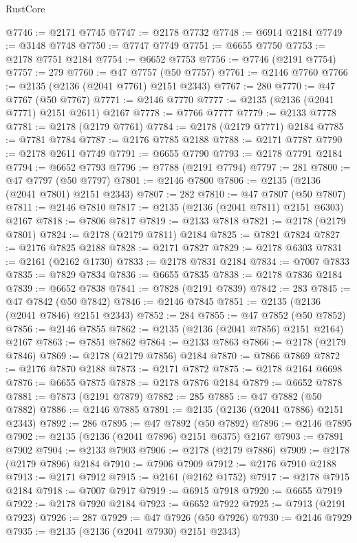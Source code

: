 \begin{lexlean}{RustCore}
\begin{coremodule}
@7746 := @2171 @7745
@7747 := @2178 @7732
@7748 := @6914 @2184
@7749 := @3148 @7748
@7750 := @7747 @7749
@7751 := @6655 @7750
@7753 := @2178 @7751 @2184
@7754 := @6652 @7753
@7756 := @7746 (@2191 @7754)
@7757 := 279
@7760 := @47 @7757 (@50 @7757)
@7761 := @2146 @7760
@7766 := @2135 (@2136 (@2041 @7761) @2151 @2343)
@7767 := 280
@7770 := @47 @7767 (@50 @7767)
@7771 := @2146 @7770
@7777 := @2135 (@2136 (@2041 @7771) @2151 @2611) @2167
@7778 := @7766 @7777
@7779 := @2133 @7778
@7781 := @2178 (@2179 @7761)
@7784 := @2178 (@2179 @7771) @2184
@7785 := @7781 @7784
@7787 := @2176 @7785 @2188
@7788 := @2171 @7787
@7790 := @2178 @2611 @7749
@7791 := @6655 @7790
@7793 := @2178 @7791 @2184
@7794 := @6652 @7793
@7796 := @7788 (@2191 @7794)
@7797 := 281
@7800 := @47 @7797 (@50 @7797)
@7801 := @2146 @7800
@7806 := @2135 (@2136 (@2041 @7801) @2151 @2343)
@7807 := 282
@7810 := @47 @7807 (@50 @7807)
@7811 := @2146 @7810
@7817 := @2135 (@2136 (@2041 @7811) @2151 @6303) @2167
@7818 := @7806 @7817
@7819 := @2133 @7818
@7821 := @2178 (@2179 @7801)
@7824 := @2178 (@2179 @7811) @2184
@7825 := @7821 @7824
@7827 := @2176 @7825 @2188
@7828 := @2171 @7827
@7829 := @2178 @6303
@7831 := @2161 (@2162 @1730)
@7833 := @2178 @7831 @2184
@7834 := @7007 @7833
@7835 := @7829 @7834
@7836 := @6655 @7835
@7838 := @2178 @7836 @2184
@7839 := @6652 @7838
@7841 := @7828 (@2191 @7839)
@7842 := 283
@7845 := @47 @7842 (@50 @7842)
@7846 := @2146 @7845
@7851 := @2135 (@2136 (@2041 @7846) @2151 @2343)
@7852 := 284
@7855 := @47 @7852 (@50 @7852)
@7856 := @2146 @7855
@7862 := @2135 (@2136 (@2041 @7856) @2151 @2164) @2167
@7863 := @7851 @7862
@7864 := @2133 @7863
@7866 := @2178 (@2179 @7846)
@7869 := @2178 (@2179 @7856) @2184
@7870 := @7866 @7869
@7872 := @2176 @7870 @2188
@7873 := @2171 @7872
@7875 := @2178 @2164 @6698
@7876 := @6655 @7875
@7878 := @2178 @7876 @2184
@7879 := @6652 @7878
@7881 := @7873 (@2191 @7879)
@7882 := 285
@7885 := @47 @7882 (@50 @7882)
@7886 := @2146 @7885
@7891 := @2135 (@2136 (@2041 @7886) @2151 @2343)
@7892 := 286
@7895 := @47 @7892 (@50 @7892)
@7896 := @2146 @7895
@7902 := @2135 (@2136 (@2041 @7896) @2151 @6375) @2167
@7903 := @7891 @7902
@7904 := @2133 @7903
@7906 := @2178 (@2179 @7886)
@7909 := @2178 (@2179 @7896) @2184
@7910 := @7906 @7909
@7912 := @2176 @7910 @2188
@7913 := @2171 @7912
@7915 := @2161 (@2162 @1752)
@7917 := @2178 @7915 @2184
@7918 := @7007 @7917
@7919 := @6915 @7918
@7920 := @6655 @7919
@7922 := @2178 @7920 @2184
@7923 := @6652 @7922
@7925 := @7913 (@2191 @7923)
@7926 := 287
@7929 := @47 @7926 (@50 @7926)
@7930 := @2146 @7929
@7935 := @2135 (@2136 (@2041 @7930) @2151 @2343)

\end{coremodule}
\end{lexlean}
